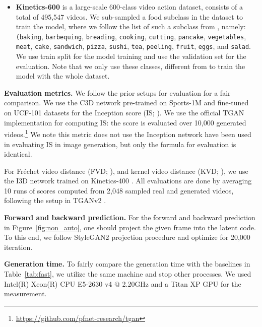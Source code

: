 \documentclass{article} \usepackage{iclr2022_conference,times}
\begin{document}
\begin{itemize}[leftmargin=0.2in]
\item \textbf{Kinetics-600} \citep{carreira2018short} is a large-scale 600-class video action dataset, consists of a total of 495,547 videos. We sub-sampled a food subclass in the dataset to train the model, where 
we follow the list of such a subclass from \citet{weissenborn2020scaling}, namely: \texttt{(baking}, \texttt{barbequing}, \texttt{breading}, \texttt{cooking}, \texttt{cutting}, \texttt{pancake}, \texttt{vegetables}, \texttt{
meat}, \texttt{cake}, \texttt{sandwich}, \texttt{pizza}, \texttt{sushi}, \texttt{tea}, \texttt{peeling}, \texttt{fruit}, \texttt{eggs}, and \texttt{salad}. We use train split for the model training and use the validation set for the evaluation. Note that we only use these classes, different from \citet{weissenborn2020scaling} to train the model with the whole dataset.

\end{itemize}
\textbf{Evaluation metrics.}
We follow the prior setups for evaluation for a fair comparison. We use the C3D network \citep{tran2015learning} pre-trained on Sports-1M \citep{karpathy2014large} and fine-tuned on UCF-101 datasets for the Inception score (IS; \citet{salimans2016improved}). We use the official TGAN \citep{saito2017temporal} implementation for computing IS: the score is evaluated over 10,000 generated videos.\footnote{\url{https://github.com/pfnet-research/tgan}} We note this metric does not use the Inception network \citep{szegedy2016rethinking} have been used in evaluating IS in image generation, but only the formula for evaluation is identical.

For Fr\'echet video distance (FVD; \citet{unterthiner2018towards}), and kernel video distance (KVD; \citet{unterthiner2018towards}), we use the I3D network trained on Kinetics-400 \citep{kay2017kinetics}. All evaluations are done by averaging 10 runs of scores computed from 2,048 sampled real and generated videos, following the setup in TGANv2 \citep{saito2020train}.









\textbf{Forward and backward prediction.} For the forward and backward prediction in Figure~\ref{fig:non_auto}, one should project the given frame into the latent code. To this end, we follow StyleGAN2 projection procedure \cite{karras2020training} and optimize for 20,000 iteration.

\textbf{Generation time.} To fairly compare the generation time with the baselines in Table~\ref{tab:fast}, we utilize the same machine and stop other processes. We used Intel(R) Xeon(R) CPU E5-2630 v4 @ 2.20GHz and a Titan XP GPU for the measurement.
\end{document}
